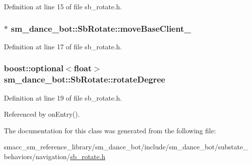Definition at line 15 of file sb\+\_\+rotate.\+h.

\subsubsection[{\texorpdfstring{move\+Base\+Client\+\_\+}{moveBaseClient_}}]{$\ast$ sm\+\_\+dance\+\_\+bot\+::\+Sb\+Rotate\+::move\+Base\+Client\+\_\+}\hypertarget{classsm__dance__bot_1_1SbRotate_a7b8658c9d207a3b88c97d77f718bd4ad}{}\label{classsm__dance__bot_1_1SbRotate_a7b8658c9d207a3b88c97d77f718bd4ad}


Definition at line 17 of file sb\+\_\+rotate.\+h.

\subsubsection[{\texorpdfstring{rotate\+Degree}{rotateDegree}}]{\setlength{\rightskip}{0pt plus 5cm}boost\+::optional$<$float$>$ sm\+\_\+dance\+\_\+bot\+::\+Sb\+Rotate\+::rotate\+Degree}\hypertarget{classsm__dance__bot_1_1SbRotate_a43e1c845c2cd8f5ba2fbcc03abc91d34}{}\label{classsm__dance__bot_1_1SbRotate_a43e1c845c2cd8f5ba2fbcc03abc91d34}


Definition at line 19 of file sb\+\_\+rotate.\+h.



Referenced by on\+Entry().



The documentation for this class was generated from the following file\+:\begin{DoxyCompactItemize}
\item 
smacc\+\_\+sm\+\_\+reference\+\_\+library/sm\+\_\+dance\+\_\+bot/include/sm\+\_\+dance\+\_\+bot/substate\+\_\+behaviors/navigation/\hyperlink{sb__rotate_8h}{sb\+\_\+rotate.\+h}\end{DoxyCompactItemize}
